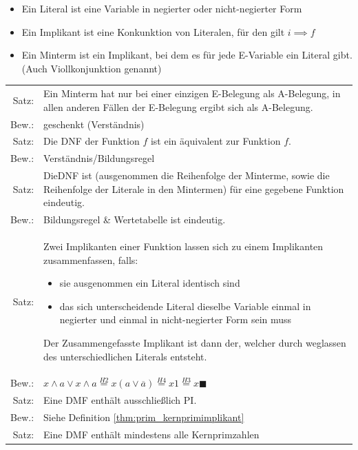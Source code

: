 \documentclass[10pt,a4paper]{scrartcl}
\begin{document}
\begin{itemize}
	\item Ein Literal ist eine Variable in negierter oder nicht-negierter Form
	\item Ein Implikant ist eine Konkunktion von Literalen, für den gilt $ i \implies f $
	\item Ein Minterm ist ein Implikant, bei dem es für jede E-Variable ein Literal gibt. (Auch Viollkonjunktion genannt)
\end{itemize}

\begin{table}[h!]
	\centering
	\begin{tabular}{rp{15cm}}
	Satz: & Ein Minterm hat nur bei einer einzigen E-Belegung \glqq 1 \grqq als A-Belegung, in allen anderen Fällen der E-Belegung ergibt sich \glqq 0\grqq als A-Belegung.\\
	Bew.:& geschenkt (Verständnis)\\ \hline
	Satz: & Die \ac{DNF} der Funktion $ f $ ist ein äquivalent zur Funktion $ f $.\\
	Bew.:& Verständnis/Bildungsregel\\ \hline
	Satz: & Die\ac{DNF} ist (ausgenommen die Reihenfolge der Minterme, sowie die Reihenfolge der Literale in den Mintermen) für eine gegebene Funktion eindeutig.\\
	Bew.:& Bildungsregel \& Wertetabelle ist eindeutig.\\ \hline
	Satz: & Zwei Implikanten einer Funktion lassen sich zu einem Implikanten zusammenfassen, falls:
	\begin{itemize}[itemsep=0mm]
		\item sie ausgenommen ein Literal identisch sind
		\item das sich unterscheidende Literal dieselbe Variable einmal in negierter und einmal in nicht-negierter Form sein muss
	\end{itemize}
	Der Zusammengefasste Implikant ist dann der, welcher durch weglassen des unterschiedlichen Literals entsteht. \\
	Bew.:&$ x \wedge a \vee x \wedge a \overset{H2}{=} x(a \vee \overline{a}) \overset{H4}{=} x1 \overset{H3}{=} x \blacksquare$\\ \hline
	Satz: & Eine \ac{DMF} enthält ausschließlich \ac{PI}.\\
	Bew.:&  Siehe Definition \ref{thm:prim_kernprimimplikant} \\ \hline
	Satz: & Eine \ac{DMF} enthält mindestens alle Kernprimzahlen
\end{tabular}
\end{table}
\end{document}
